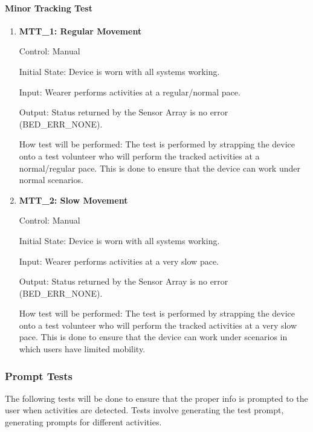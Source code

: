 \documentclass[12pt, titlepage]{article}
\begin{document}
\paragraph{Minor Tracking Test}
\begin{enumerate}
	\item{\textbf{MTT\_1: Regular Movement} \\}\label{MTT1}
	
		Control: Manual 
							
		Initial State: Device is worn with all systems working.
							
		Input: Wearer performs activities at a regular/normal pace.
		
		Output: Status returned by the Sensor Array is no error (BED\_ERR\_NONE).

		How test will be performed: The test is performed by strapping the device onto a test volunteer who will perform the tracked activities at a normal/regular pace. This is done to ensure that the device can 				work under normal scenarios.\\


	\item{\textbf{MTT\_2: Slow Movement} \\}\label{MTT2}
	
		Control: Manual 
							
		Initial State: Device is worn with all systems working.
							
		Input: Wearer performs activities at a very slow pace.
		
		Output: Status returned by the Sensor Array is no error (BED\_ERR\_NONE).
		
		How test will be performed: The test is performed by strapping the device onto a test volunteer who will perform the tracked activities at a very slow pace. This is done to ensure that the device can 					work under scenarios in which users have limited mobility.\\


\end{enumerate}
\subsubsection{Prompt Tests}

The following tests will be done to ensure that the proper info is prompted to the user when activities are detected. Tests involve generating the test prompt, generating prompts for different activities.
\end{document}
